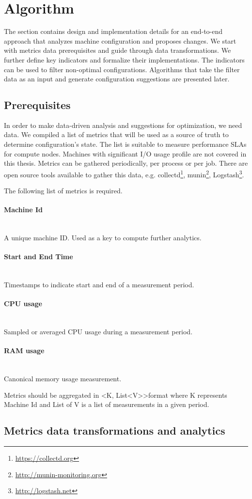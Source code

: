 \documentclass[]{final_report}
\newcommand{\myparagraph}[1]{\paragraph{#1}\mbox{}\\}
\begin{document}
\section{Algorithm}

The section contains design and implementation details for an end-to-end approach that analyzes machine configuration and proposes changes.
We start with metrics data prerequisites and guide through data transformations. We further define key indicators and formalize their implementations. The indicators can be used to filter non-optimal configurations. Algorithms that take the filter data as an input and generate configuration suggestions are presented later.

\subsection{Prerequisites} 

In order to make data-driven analysis and suggestions for optimization, we need data. We compiled a list of metrics that will be used as a source of truth to determine configuration's state. The list is suitable to measure performance SLAs for compute nodes. Machines with significant I/O usage profile are not covered in this thesis. 
Metrics can be gathered periodically, per process or per job. There are open source tools available to gather this data, e.g. collectd\footnote{\url{https://collectd.org}}, munin\footnote{\url{http://munin-monitoring.org}}, Logstash\footnote{\url{http://logstash.net}}.

The following list of metrics is required.
\myparagraph{Machine Id}
A unique machine ID. Used as a key to compute further analytics.

\myparagraph{Start and End Time}
Timestamps to indicate start and end of a measurement period.

\myparagraph{CPU usage}
Sampled or averaged CPU usage during a measurement period. 

\myparagraph{RAM usage}
Canonical memory usage measurement. 

Metrics should be aggregated in \textless K, List\textless V\textgreater\textgreater format where K represents Machine Id and List of V is a list of measurements in a given period. 

\subsection{Metrics data transformations and analytics}
\end{document}
